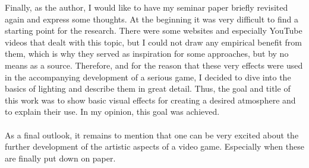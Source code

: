 \newpage
Finally, as the author, I would like to have my seminar paper briefly revisited again and express some thoughts. At the beginning it was very difficult to find a starting point for the research. There were some websites and especially YouTube videos that dealt with this topic, but I could not draw any empirical benefit from them, which is why they served as inspiration for some approaches, but by no means as a source. Therefore, and for the reason that these very effects were used in the accompanying development of a serious game, I decided to dive into the basics of lighting and describe them in great detail. Thus, the goal and title of this work was to show basic visual effects for creating a desired atmosphere and to explain their use. In my opinion, this goal was achieved. \\\\

As a final outlook, it remains to mention that one can be very excited about the further development of the artistic aspects of a video game. Especially when these are finally put down on paper.